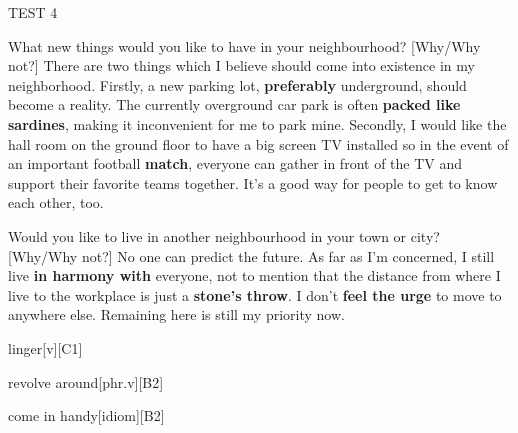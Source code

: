 \begin{glossarymc}[Cambridge 14]
\begin{test}{TEST 4}
    \begin{qa}{What new things would you like to have in your neighbourhood? [Why/Why not?]}
    There are two things which I believe should come into existence in my neighborhood. Firstly, a new parking lot, \textbf{preferably} underground, should become a reality. The currently overground car park is often \textbf{packed like sardines}, making it inconvenient for me to park mine. Secondly, I would like the hall room on the ground floor to have a big screen TV installed so in the event of an important football \textbf{match}, everyone can gather in front of the TV and support their favorite teams together. It’s a good way for people to get to know each other, too.
    \end{qa}

    \begin{qa}{Would you like to live in another neighbourhood in your town or city? [Why/Why not?]}
    No one can predict the future. As far as I’m concerned, I still live \textbf{in harmony with} everyone, not to mention that the distance from where I live to the workplace is just a \textbf{stone’s throw}. I don’t \textbf{feel the urge} to move to anywhere else. Remaining here is still my priority now.
    \end{qa}

        \begin{VocabExplain}[Part 1]
            \begin{ExplainCard}{linger}[v][C1]
            \end{ExplainCard}

            \begin{ExplainCard}{revolve around}[phr.v][B2]
            \end{ExplainCard}

            \begin{ExplainCard}{come in handy}[idiom][B2]
            \end{ExplainCard}


\end{VocabExplain}
\end{test}
\end{glossarymc}
